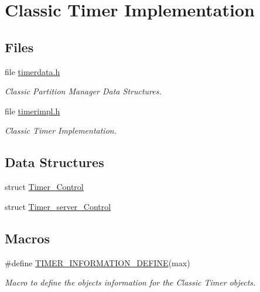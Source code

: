 \hypertarget{group__ClassicTimerImpl}{}\section{Classic Timer Implementation}
\label{group__ClassicTimerImpl}
\subsection*{Files}
\begin{DoxyCompactItemize}
\item 
file \mbox{\hyperlink{timerdata_8h}{timerdata.\+h}}
\begin{DoxyCompactList}\small\item\em Classic Partition Manager Data Structures. \end{DoxyCompactList}\item 
file \mbox{\hyperlink{rtems_2timerimpl_8h}{timerimpl.\+h}}
\begin{DoxyCompactList}\small\item\em Classic Timer Implementation. \end{DoxyCompactList}\end{DoxyCompactItemize}
\subsection*{Data Structures}
\begin{DoxyCompactItemize}
\item 
struct \mbox{\hyperlink{structTimer__Control}{Timer\+\_\+\+Control}}
\item 
struct \mbox{\hyperlink{structTimer__server__Control}{Timer\+\_\+server\+\_\+\+Control}}
\end{DoxyCompactItemize}
\subsection*{Macros}
\begin{DoxyCompactItemize}
\item 
\#define \mbox{\hyperlink{group__ClassicTimerImpl_gacd5bc085aebf83583143639317d97c4e}{T\+I\+M\+E\+R\+\_\+\+I\+N\+F\+O\+R\+M\+A\+T\+I\+O\+N\+\_\+\+D\+E\+F\+I\+NE}}(max)
\begin{DoxyCompactList}\small\item\em Macro to define the objects information for the Classic Timer objects. \end{DoxyCompactList}\end{DoxyCompactItemize}
